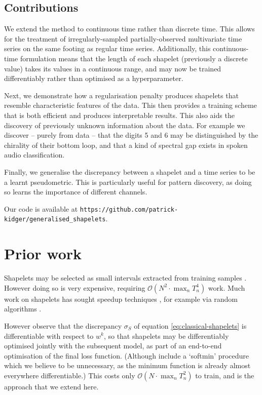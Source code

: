 \documentclass{article}
\theoremstyle{plain}
\theoremstyle{definition}
\newcommand{\bigO}{\mathcal{O}}
\begin{document}
	\subsection{Contributions}
	We extend the method to continuous time rather than discrete time. This allows for the treatment of irregularly-sampled partially-observed multivariate time series on the same footing as regular time series. Additionally, this continuous-time formulation means that the length of each shapelet (previously a discrete value) takes its values in a continuous range, and may now be trained differentiably rather than optimised as a hyperparameter.
	
	Next, we demonstrate how a regularisation penalty produces shapelets that resemble characteristic features of the data. This then provides a training scheme that is both efficient and produces interpretable results. This also aids the discovery of previously unknown information about the data. For example we discover -- purely from data -- that the digits 5 and 6 may be distinguished by the chirality of their bottom loop, and that a kind of spectral gap exists in spoken audio classification.
	
	Finally, we generalise the discrepancy between a shapelet and a time series to be a learnt pseudometric. This is particularly useful for pattern discovery, as doing so learns the importance of different channels.%
	
	Our code is available at \texttt{https://github.com/patrick-kidger/generalised\_shapelets}.
	
	\section{Prior work}
	Shapelets may be selected as small intervals extracted from training samples \cite{ye2009firstshapelet}. However doing so is very expensive, requiring $\bigO(N^2 \cdot \max_n T_n^4)$ work. Much work on shapelets has sought speedup techniques \cite{mueen2011logical, grabocka2015scalable, grabocka2016speedshapelet}, for example via random algorithms \cite{rak2013fast, wistuba2015ultrafast}.
	
	However \cite{grabocka2014learningshapelet} observe that the discrepancy $\sigma_S$ of equation \eqref{eq:classical-shapelets} is differentiable with respect to $w^{k}$, so that shapelets may be differentiably optimised jointly with the subsequent model, as part of an end-to-end optimisation of the final loss function. (Although \cite{grabocka2014learningshapelet} include a `softmin' procedure which we believe to be unnecessary, as the minimum function is already almost everywhere differentiable.) This costs only $\bigO(N \cdot \max_n T_n^2)$ to train, and is the approach that we extend here.
	
\end{document}
